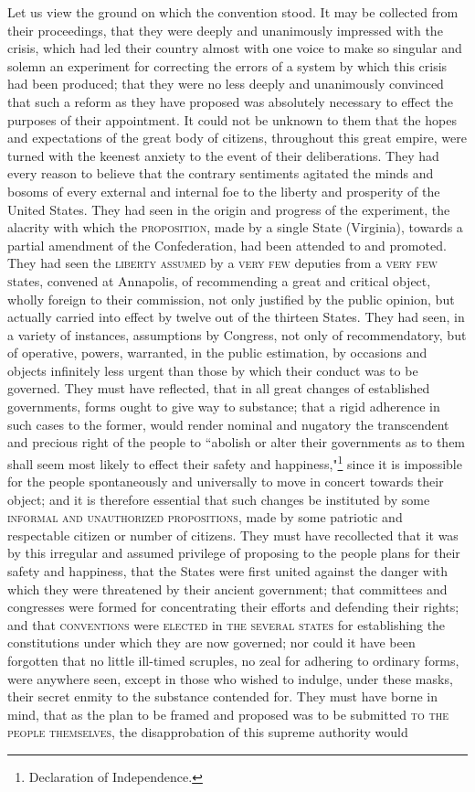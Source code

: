 Let us view the ground on which the convention stood. It may be collected from their proceedings, that they were deeply and unanimously impressed with the crisis, which had led their country almost with one voice to make so singular and solemn an experiment for correcting the errors of a system by which this crisis had been produced; that they were no less deeply and unanimously convinced that such a reform as they have proposed was absolutely necessary to effect the purposes of their appointment. It could not be unknown to them that the hopes and expectations of the great body of citizens, throughout this great empire, were turned with the keenest anxiety to the event of their deliberations. They had every reason to believe that the contrary sentiments agitated the minds and bosoms of every external and internal foe to the liberty and prosperity of the United States. They had seen in the origin and progress of the experiment, the alacrity with which the \textsc{proposition}, made by a single State (Virginia), towards a partial amendment of the Confederation, had been attended to and promoted. They had seen the \textsc{liberty assumed} by a \textsc{very few} deputies from a \textsc{very few s}tates, convened at Annapolis, of recommending a great and critical object, wholly foreign to their commission, not only justified by the public opinion, but actually carried into effect by twelve out of the thirteen States. They had seen, in a variety of instances, assumptions by Congress, not only of recommendatory, but of operative, powers, warranted, in the public estimation, by occasions and objects infinitely less urgent than those by which their conduct was to be governed. They must have reflected, that in all great changes of established governments, forms ought to give way to substance; that a rigid adherence in such cases to the former, would render nominal and nugatory the transcendent and precious right of the people to ``abolish or alter their governments as to them shall seem most likely to effect their safety and happiness,"\footnote{Declaration of Independence.} since it is impossible for the people spontaneously and universally to move in concert towards their object; and it is therefore essential that such changes be instituted by some \textsc{informal and unauthorized propositions}, made by some patriotic and respectable citizen or number of citizens. They must have recollected that it was by this irregular and assumed privilege of proposing to the people plans for their safety and happiness, that the States were first united against the danger with which they were threatened by their ancient government; that committees and congresses were formed for concentrating their efforts and defending their rights; and that \textsc{conventions} were \textsc{elected} in \textsc{the several states} for establishing the constitutions under which they are now governed; nor could it have been forgotten that no little ill-timed scruples, no zeal for adhering to ordinary forms, were anywhere seen, except in those who wished to indulge, under these masks, their secret enmity to the substance contended for. They must have borne in mind, that as the plan to be framed and proposed was to be submitted \textsc{to the people themselves}, the disapprobation of this supreme authority would 
